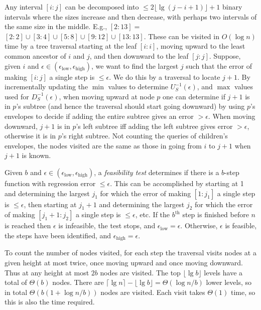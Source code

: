 \documentclass[11pt]{article}
\newcommand{\inter}[2]{\ensuremath{[#1\!:\!#2]}}
\newcommand{\epslow}{\ensuremath{\epsilon_\mathrm{low}}}
\newcommand{\epshigh}{\ensuremath{\epsilon_\mathrm{high}}}
\newcommand{\epsinterval}[1]{\ensuremath{(\epslow,\epshigh#1}}
\begin{document}
Any interval \inter{i}{j} can be decomposed into $\leq 2 \lfloor \lg (j\!-\!i\!+\!1) \rfloor + 1$
binary intervals where the sizes increase and then decrease, with perhaps two intervals of the same size in the middle.
E.g., $\inter{2}{13} =$ $\inter{2}{2} \cup \inter{3}{4} \cup \inter{5}{8} \cup 
\inter{9}{12} \cup \inter{13}{13}$.
These can be visited in $O(\log n)$ time by a tree traversal starting at the leaf $\inter{i}{i}$, moving upward to the least common ancestor of $i$ and $j$, and then downward to the leaf $\inter{j}{j}$.
Suppose, given $i$ and $\epsilon \in \epsinterval{)}$, we want to find the largest $j$ such that the error of making \inter{i}{j} a single step is $\leq \epsilon$.
We do this by a traversal to locate $j+1$.
By incrementally updating the $\min$ values to determine $U^{-1}_S(\epsilon)$, and $\max$ values used for $D^{-1}_S(\epsilon)$, when moving upward at node $p$ one can determine if $j+1$ is in $p$'s subtree (and hence the traversal should start going downward) by using $p$'s envelopes to decide if adding the entire subtree gives an error $> \epsilon$.
When moving downward, $j+1$ is in $p$'s left subtree iff adding the left subtree gives error $> \epsilon$, otherwise it is in $p$'s right subtree.
Not counting the queries of children's envelopes, the nodes visited are the same as those in going from $i$ to $j+1$ when $j+1$ is known.


Given $b$ and $\epsilon \in \epsinterval{)}$, a \textit{feasibility test} determines if there is a $b$-step function with regression error $\leq \epsilon$.
This can be accomplished by starting at 1 and determining the largest $j_1$ for which the error of making \inter{1}{j_1} a single step is $\leq \epsilon$, then starting at $j_1+1$ and determining the largest $j_2$ for which the error of making \inter{j_1+1}{j_2} a single step is $\leq \epsilon$, etc.
If the $b^\mathrm{th}$ step is finished before $n$ is reached then $\epsilon$ is infeasible, the test stops, and $\epslow=\epsilon$.
Otherwise, $\epsilon$ is feasible, the steps have been identified, and $\epshigh=\epsilon$.

To count the number of nodes visited, for each step the traversal visits nodes at a given height at most twice, once moving upward and once moving downward.
Thus at any height at most $2b$ nodes are visited.
The top $\lfloor \lg b \rfloor$ levels have a total of $\Theta(b)$ nodes.
There are $\lceil \lg n \rceil - \lfloor \lg b \rfloor = \Theta(\log n/b)$ lower levels, so in total 
$\Theta(b(1+\log n/b))$ nodes are visited.
Each visit takes $\Theta(1)$ time, so this is also the time required.
\end{document}

